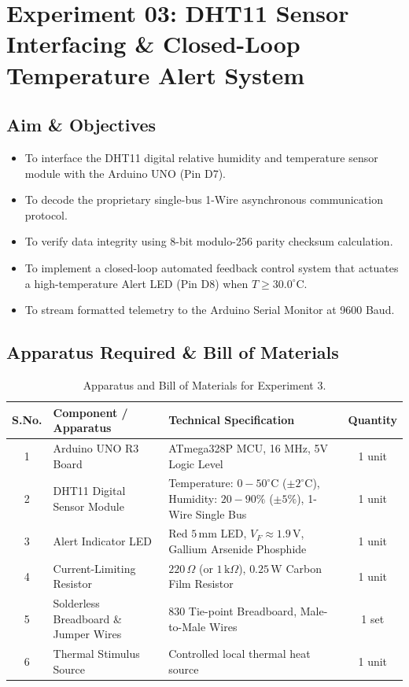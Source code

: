 \documentclass[11pt,a4paper]{article}
\begin{document}
\newpage

\section{Experiment 03: DHT11 Sensor Interfacing \& Closed-Loop Temperature Alert System}

\subsection{Aim \& Objectives}
\begin{itemize}[noitemsep]
    \item To interface the DHT11 digital relative humidity and temperature sensor module with the Arduino UNO (Pin D7).
    \item To decode the proprietary single-bus 1-Wire asynchronous communication protocol.
    \item To verify data integrity using 8-bit modulo-256 parity checksum calculation.
    \item To implement a closed-loop automated feedback control system that actuates a high-temperature Alert LED (Pin D8) when $T \ge 30.0^\circ\text{C}$.
    \item To stream formatted telemetry to the Arduino Serial Monitor at 9600 Baud.
\end{itemize}

\subsection{Apparatus Required \& Bill of Materials}
\begin{table}[H]
\centering
\footnotesize
\renewcommand{\arraystretch}{1.25}
\begin{tabularx}{\textwidth}{|c|l|X|c|}
\hline
\textbf{S.No.} & \textbf{Component / Apparatus} & \textbf{Technical Specification} & \textbf{Quantity} \\
\hline
1 & Arduino UNO R3 Board & ATmega328P MCU, 16 MHz, 5V Logic Level & 1 unit \\
2 & DHT11 Digital Sensor Module & Temperature: $0-50^\circ\text{C}$ ($\pm 2^\circ\text{C}$), Humidity: $20-90\%$ ($\pm 5\%$), 1-Wire Single Bus & 1 unit \\
3 & Alert Indicator LED & Red $5\,\text{mm}$ LED, $V_F \approx 1.9\,\text{V}$, Gallium Arsenide Phosphide & 1 unit \\
4 & Current-Limiting Resistor & $220\,\Omega$ (or $1\,\text{k}\Omega$), $0.25\,\text{W}$ Carbon Film Resistor & 1 unit \\
5 & Solderless Breadboard \& Jumper Wires & 830 Tie-point Breadboard, Male-to-Male Wires & 1 set \\
6 & Thermal Stimulus Source & Controlled local thermal heat source & 1 unit \\
\hline
\end{tabularx}
\caption{Apparatus and Bill of Materials for Experiment 3.}
\label{tab:exp3_bom}
\end{table}
\end{document}
